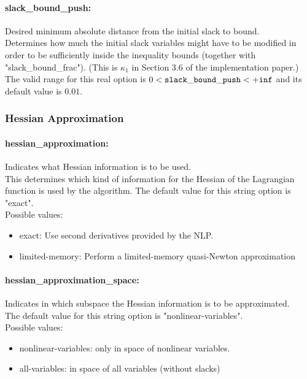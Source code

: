 \paragraph{slack\_bound\_push:}\label{sec:slack_bound_push} Desired minimum absolute distance from the initial slack to bound. $\;$ \\
 Determines how much the initial slack variables
might have to be modified in order to be
sufficiently inside the inequality bounds
(together with "slack\_bound\_frac").  (This is
$\kappa_1$ in Section 3.6 of the implementation paper.) The valid range for this real option is 
$0 <  {\tt slack\_bound\_push } <  {\tt +inf}$
and its default value is $0.01$.


\subsubsection{Hessian Approximation}
\label{sec:Hessian_Approximation}

\paragraph{hessian\_approximation:}\label{sec:hessian_approximation} Indicates what Hessian information is to be used. $\;$ \\
 This determines which kind of information for the
Hessian of the Lagrangian function is used by the
algorithm.
The default value for this string option is "exact".
\\ 
Possible values:
\begin{itemize}
   \item exact: Use second derivatives provided by the NLP.
   \item limited-memory: Perform a limited-memory quasi-Newton
approximation
\end{itemize}

\paragraph{hessian\_approximation\_space:}\label{sec:hessian_approximation_space} Indicates in which subspace the Hessian information is to be approximated. $\;$ \\
The default value for this string option is "nonlinear-variables".
\\ 
Possible values:
\begin{itemize}
   \item nonlinear-variables: only in space of nonlinear variables.
   \item all-variables: in space of all variables (without slacks)
\end{itemize}

